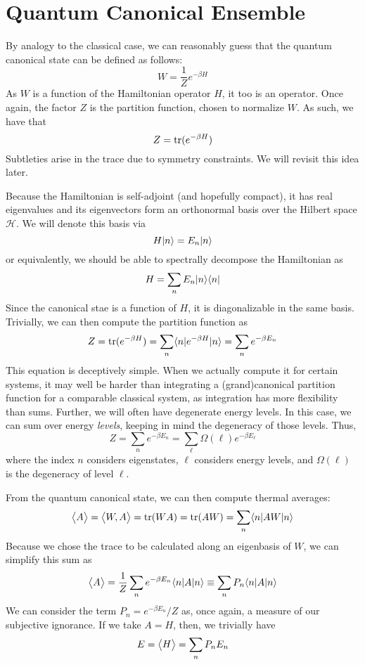 \chapter{Quantum Canonical Ensemble}
By analogy to the classical case, we can reasonably guess that the quantum canonical state can be defined as follows:
\begin{equation}
	W = \frac{1}{Z}e^{-\beta H}
\end{equation}
As \(W\) is a function of the Hamiltonian operator \(H\), it too is an operator. Once again, the factor \(Z\) is the partition function, chosen to normalize \(W\). As such, we have that
\begin{equation}
	Z = \operatorname{tr}(e^{-\beta H})
\end{equation}
Subtleties arise in the trace due to symmetry constraints. We will revisit this idea later. 

Because the Hamiltonian is self-adjoint (and hopefully compact), it has real eigenvalues and its eigenvectors form an orthonormal basis over the Hilbert space \(\mathscr H\). We will denote this basis via
\begin{equation}
	H\lvert n\rangle = E_n\lvert n\rangle
\end{equation}
or equivalently, we should be able to spectrally decompose the Hamiltonian as
\[H = \sum_n E_n \lvert n\rangle \langle n\rvert\]
Since the canonical stae is a function of \(H\), it is diagonalizable in the same basis. Trivially, we can then compute the partition function as
\[Z = \operatorname{tr}(e^{-\beta H}) = \sum_n\langle n\rvert e^{-\beta H} \lvert n\rangle = \sum_n e^{-\beta E_n}\]
This equation is deceptively simple. When we actually compute it for certain systems, it may well be harder than integrating a (grand)canonical partition function for a comparable classical system, as integration has more flexibility than sums. Further, we will often have degenerate energy levels. In this case, we can sum over energy \emph{levels}, keeping in mind the degeneracy of those levels. Thus,
\begin{equation}
	Z = \sum_n e^{-\beta E_n} = \sum_\ell \Omega(\ell)e^{-\beta E_\ell}
\end{equation}
where the index \(n\) considers eigenstates, \(\ell\) considers energy levels, and \(\Omega(\ell)\) is the degeneracy of level \(\ell\). 

\begin{aside}
From the quantum canonical state, we can then compute thermal averages:
\[\left\langle \begin{matrix}A\end{matrix} \right\rangle = \left\langle \begin{matrix}W,A\end{matrix} \right\rangle = \operatorname{tr}(WA) = \operatorname{tr}(AW) = \sum_n \langle n\rvert AW \lvert n\rangle\]
Because we chose the trace to be calculated along an eigenbasis of \(W\), we can simplify this sum as
\begin{equation}
	\left\langle \begin{matrix}A\end{matrix} \right\rangle = \frac{1}{Z}\sum_n e^{-\beta E_n} \langle n\rvert A \lvert n\rangle \equiv \sum_n P_n \langle n\rvert A \lvert n\rangle
\end{equation}
We can consider the term \(P_n  = e^{-\beta E_n}/Z\) as, once again, a measure of our subjective ignorance. If we take \(A= H\), then, we trivially have
\[E = \left\langle \begin{matrix}H\end{matrix} \right\rangle = \sum_n P_n E_n\]
\end{aside}

